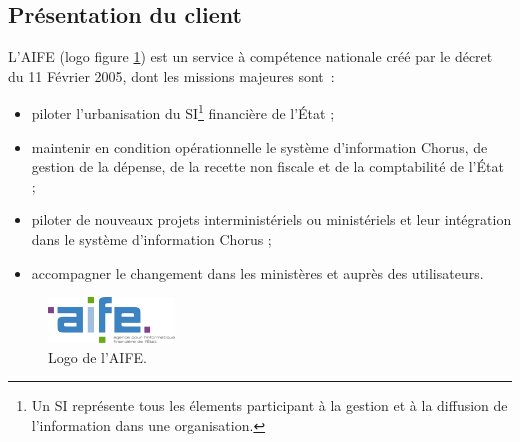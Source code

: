 \documentclass[12pt,a4paper]{article}
\begin{document}
\subsection{Présentation du client}
L'AIFE (logo figure \ref{logoAife}) est un service à compétence nationale créé par le décret du 11 Février 2005, dont les missions majeures sont~:
\begin{itemize}
\item piloter l’urbanisation du \gls{SI}\footnote{Un SI représente tous les élements participant à la gestion et à la diffusion de l'information dans une organisation.} financière de l’État ;
\item maintenir en condition opérationnelle le système d’information Chorus, de gestion de la dépense, de la recette non fiscale et de la comptabilité de l’État ;
\item piloter de nouveaux projets interministériels ou ministériels et leur intégration dans le système d’information Chorus ;
\item accompagner le changement dans les ministères et auprès des utilisateurs.
\end{itemize}
\begin{figure}[H]
\begin{center}
\includegraphics[width=0.3\textwidth, height=\textheight, keepaspectratio]{aifedef.png}
\caption{Logo de l'AIFE.}
\label{logoAife}
\end{center}
\end{figure}
\newpage
\end{document}
